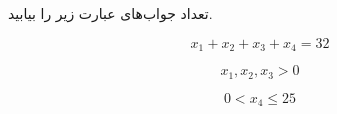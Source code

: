 \EXERCISE
تعداد جواب‌های عبارت زیر را بیابید.

$$x_1 + x_2 + x_3 + x_4 = 32$$

$$x_1, x_2, x_3 > 0$$

$$0 < x_4 \leq 25$$